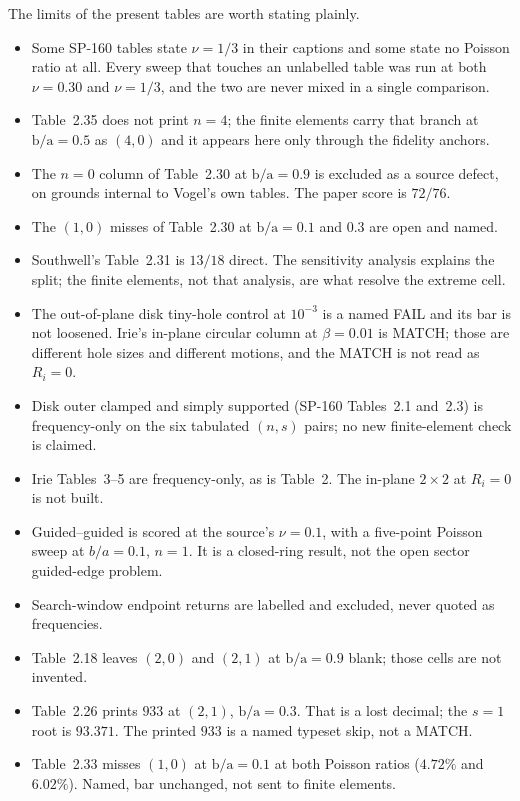 \documentclass[11pt]{article}
\newcommand{\ba}{\mbox{b/a}}
\begin{document}
The limits of the present tables are worth stating plainly.

\begin{itemize}\itemsep3pt
\item Some SP-160 tables state $\nu=1/3$ in their captions and some state no
      Poisson ratio at all. Every sweep that touches an unlabelled table was
      run at both $\nu=0.30$ and $\nu=1/3$, and the two are never mixed in a
      single comparison.
\item Table~2.35 does not print $n=4$; the finite elements carry that branch
      at $\ba=0.5$ as $(4,0)$ and it appears here only through the fidelity
      anchors.
\item The $n=0$ column of Table~2.30 at $\ba=0.9$ is excluded as a source
      defect, on grounds internal to Vogel's own tables. The paper score is
      $72/76$.
\item The $(1,0)$ misses of Table~2.30 at $\ba=0.1$ and $0.3$ are open and
      named.
\item Southwell's Table~2.31 is $13/18$ direct. The sensitivity analysis
      explains the split; the finite elements, not that analysis, are what
      resolve the extreme cell.
\item The out-of-plane disk tiny-hole control at $10^{-3}$ is a named FAIL
      and its bar is not loosened. Irie's in-plane circular column at
      $\beta=0.01$ is MATCH; those are different hole sizes and different
      motions, and the MATCH is not read as $R_i=0$.
\item Disk outer clamped and simply supported (SP-160 Tables~2.1 and~2.3)
      is frequency-only on the six tabulated $(n,s)$ pairs; no new
      finite-element check is claimed.
\item Irie Tables~3--5 are frequency-only, as is Table~2. The in-plane
      $2\times2$ at $R_i=0$ is not built.
\item Guided--guided is scored at the source's $\nu=0.1$, with a five-point
      Poisson sweep at $b/a=0.1$, $n=1$. It is a closed-ring result, not
      the open sector guided-edge problem.
\item Search-window endpoint returns are labelled and excluded, never quoted
      as frequencies.
\item Table~2.18 leaves $(2,0)$ and $(2,1)$ at $\ba=0.9$ blank; those cells
      are not invented.
\item Table~2.26 prints $933$ at $(2,1)$, $\ba=0.3$. That is a lost decimal;
      the $s=1$ root is $93.371$. The printed $933$ is a named typeset skip,
      not a MATCH.
\item Table~2.33 misses $(1,0)$ at $\ba=0.1$ at both Poisson ratios
      ($4.72\%$ and $6.02\%$). Named, bar unchanged, not sent to finite
      elements.
\end{itemize}
\end{document}
